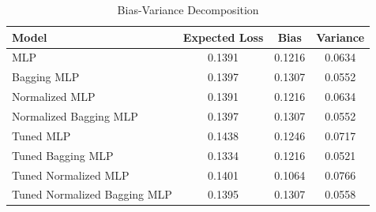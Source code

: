 \begin{table}[ht]
    \centering
    \begin{tabular}{lccc}
        \hline
        Model                        & Expected Loss & Bias   & Variance \\
        \hline
        MLP                          & 0.1391        & 0.1216 & 0.0634   \\
        Bagging MLP                  & 0.1397        & 0.1307 & 0.0552   \\
        Normalized MLP               & 0.1391        & 0.1216 & 0.0634   \\
        Normalized Bagging MLP       & 0.1397        & 0.1307 & 0.0552   \\
        Tuned MLP                    & 0.1438        & 0.1246 & 0.0717   \\
        Tuned Bagging MLP            & 0.1334        & 0.1216 & 0.0521   \\
        Tuned Normalized MLP         & 0.1401        & 0.1064 & 0.0766   \\
        Tuned Normalized Bagging MLP & 0.1395        & 0.1307 & 0.0558   \\
        \hline
    \end{tabular}
    \caption{Bias-Variance Decomposition}
    \label{tab:bias_variance_decomp}
\end{table}



